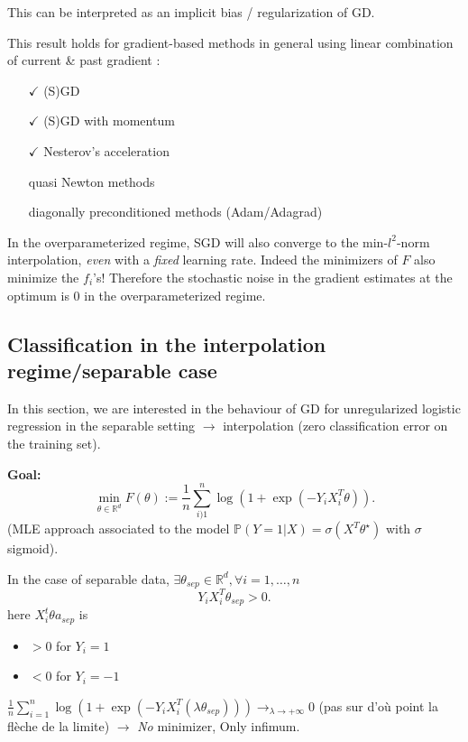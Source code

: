 This can be interpreted as an implicit bias / regularization of GD.
\begin{note}[]
    This result holds for gradient-based methods in general using linear combination of current \& past gradient : 
    \begin{itemize}
        \item[$\checkmark$] (S)GD
        \item[$\checkmark$] (S)GD with momentum
        \item[$\checkmark$] Nesterov's acceleration
        \item[\texttimes] quasi Newton methods
        \item[\texttimes] diagonally preconditioned methods (Adam/Adagrad)
    \end{itemize}
\end{note}
\begin{note}[]
    In the overparameterized regime, SGD will also converge to the min-$ l^2 $-norm interpolation, \textit{even} with a \textit{fixed} learning rate. Indeed the minimizers of $ F $ also minimize the $ f_i $'s! Therefore the stochastic noise in the gradient estimates at the optimum is $ 0 $ in the overparameterized regime.
\end{note}

\subsection{Classification in the interpolation regime/separable case}
In this section, we are interested in the behaviour of GD for unregularized logistic regression in the separable setting $\rightarrow$ interpolation (zero classification error on the training set). 

\textbf{Goal:} 
\[
    \min _{\theta \in \mathbb{R}^d} F(\theta ) := \frac{1}{n} \sum_{i)1}^{n} \log (1 + \exp (-Y_i X_i ^T \theta )) 
.\]
(MLE approach associated to the model $ \mathbb{P}(Y=1 | X) = \sigma (X^T \theta ^\star ) $ with $ \sigma  $ sigmoid).

In the case of separable data, $ \exists \theta _{sep} \in \mathbb{R}^d, \forall i = 1, \dots, n$ 
\[
    Y_i X_i^T \theta _{sep} > 0
.\]
here $ X_i^t \theta a_{sep} $ is \begin{itemize}
    \item $ > 0 $ for $ Y_i = 1 $
    \item $ < 0 $ for $ Y_i = -1 $
\end{itemize}
$ \frac{1}{n } \sum_{i=1}^{n }\log (1 + \exp (- Y_i X_i ^T (\lambda \theta _{sep}))) \to _{\lambda \to +\infty } 0 $ (pas sur d'où point la flèche de la limite) $\rightarrow$ \textit{No} minimizer, Only infimum.

